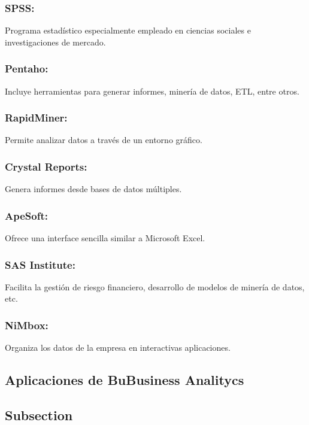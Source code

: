 \subsubsection{SPSS: }\label{sec:nada2}  
Programa estadístico especialmente empleado en ciencias sociales e investigaciones de mercado.

\subsubsection{Pentaho: }\label{sec:nada2}  
Incluye herramientas para generar informes, minería de datos, ETL, entre otros.

\subsubsection{RapidMiner: }\label{sec:nada2}  
Permite analizar datos a través de un entorno gráfico.

\subsubsection{Crystal Reports: }\label{sec:nada2}  
Genera informes desde bases de datos múltiples.

\subsubsection{ApeSoft: }\label{sec:nada2}  
Ofrece una interface sencilla similar a Microsoft Excel.

\subsubsection{SAS Institute: }\label{sec:nada2}  
Facilita la gestión de riesgo financiero, desarrollo de modelos de minería de datos, etc.

\subsubsection{NiMbox: }\label{sec:nada2}  
Organiza los datos de la empresa en interactivas aplicaciones.



\subsection{Aplicaciones de BuBusiness Analitycs } \label{sec:nada}
\subsection{Subsection}\label{sec:nada}

